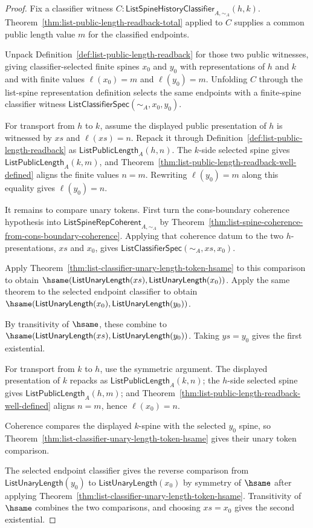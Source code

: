 \begin{proof}
Fix a classifier witness
$C:\mathsf{ListSpineHistoryClassifier}_{A,\sim_A}(h,k)$.
Theorem~\ref{thm:list-public-length-readback-total} applied to $C$ supplies a
common public length value $m$ for the classified endpoints.

Unpack Definition~\ref{def:list-public-length-readback} for those two public
witnesses, giving classifier-selected finite spines $x_0$ and $y_0$ with
representations of $h$ and $k$ and with finite values $\ell(x_0)=m$ and
$\ell(y_0)=m$. Unfolding $C$ through the list-spine representation definition
selects the same endpoints with a finite-spine classifier witness
$\mathsf{ListClassifierSpec}(\sim_A,x_0,y_0)$.

For transport from $h$ to $k$, assume the displayed public presentation of $h$
is witnessed by $xs$ and $\ell(xs)=n$. Repack it through
Definition~\ref{def:list-public-length-readback} as
$\mathsf{ListPublicLength}_A(h,n)$. The $k$-side selected spine gives
$\mathsf{ListPublicLength}_A(k,m)$, and
Theorem~\ref{thm:list-public-length-readback-well-defined} aligns the finite
values $n=m$. Rewriting $\ell(y_0)=m$ along this equality gives
$\ell(y_0)=n$.

It remains to compare unary tokens. First turn the cons-boundary coherence
hypothesis into $\mathsf{ListSpineRepCoherent}_{A,\sim_A}$ by
Theorem~\ref{thm:list-spine-coherence-from-cons-boundary-coherence}. Applying
that coherence datum to the two $h$-presentations, $xs$ and $x_0$, gives
$\mathsf{ListClassifierSpec}(\sim_A,xs,x_0)$.

Apply Theorem~\ref{thm:list-classifier-unary-length-token-hsame} to this
comparison to obtain
$\hsame(\mathsf{ListUnaryLength}(xs),\mathsf{ListUnaryLength}(x_0))$. Apply the
same theorem to the selected endpoint classifier to obtain
$\hsame(\mathsf{ListUnaryLength}(x_0),\mathsf{ListUnaryLength}(y_0))$.

By transitivity of $\hsame$, these combine to
$\hsame(\mathsf{ListUnaryLength}(xs),\mathsf{ListUnaryLength}(y_0))$. Taking
$ys=y_0$ gives the first existential.

For transport from $k$ to $h$, use the symmetric argument. The displayed
presentation of $k$ repacks as $\mathsf{ListPublicLength}_A(k,n)$; the
$h$-side selected spine gives $\mathsf{ListPublicLength}_A(h,m)$; and
Theorem~\ref{thm:list-public-length-readback-well-defined} aligns $n=m$, hence
$\ell(x_0)=n$.

Coherence compares the displayed $k$-spine with the selected $y_0$ spine, so
Theorem~\ref{thm:list-classifier-unary-length-token-hsame} gives their unary
token comparison.

The selected endpoint classifier gives the reverse comparison from
$\mathsf{ListUnaryLength}(y_0)$ to $\mathsf{ListUnaryLength}(x_0)$ by symmetry
of $\hsame$ after applying
Theorem~\ref{thm:list-classifier-unary-length-token-hsame}. Transitivity of
$\hsame$ combines the two comparisons, and choosing $xs=x_0$ gives the second
existential.
\end{proof}
